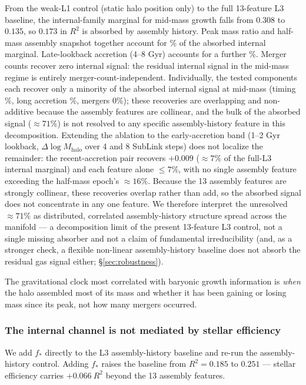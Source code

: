 \documentclass[twocolumn,linenumbers]{aastex701}
\newcommand{\fstar}{f_*}
\begin{document}
From the weak-L1 control (static halo position only) to the full 13-feature L3
baseline, the internal-family marginal for mid-mass growth falls from $0.308$ to
$0.135$, so $0.173$ in $R^2$ is absorbed by assembly history.
Peak mass ratio and half-mass assembly snapshot together account for
\AblationTimingPct\% of the absorbed internal marginal.
Late-lookback accretion (4--8 Gyr) accounts for a further
\AblationLongAccretionPct\%.
Merger counts recover zero internal signal: the residual internal signal in
the mid-mass regime is entirely merger-count-independent.
Individually, the tested components each recover only a minority of the absorbed
internal signal at mid-mass (timing \AblationTimingPct\%, long accretion
\AblationLongAccretionPct\%, mergers 0\%); these recoveries are overlapping and
non-additive because the assembly features are collinear, and the bulk of the
absorbed signal ($\approx 71\%$) is not resolved to any specific assembly-history
feature in this
decomposition.
Extending the ablation to the early-accretion band (1--2 Gyr lookback,
$\Delta\log M_\mathrm{halo}$ over 4 and 8 SubLink steps) does not localize the
remainder: the recent-accretion pair recovers $+0.009$ ($\approx 7\%$ of the
full-L3 internal marginal) and each feature alone $\leq 7\%$, with no single
assembly feature exceeding the half-mass epoch's $\approx 16\%$. Because the 13
assembly features are strongly collinear, these recoveries overlap rather than
add, so the absorbed signal does not concentrate in any one feature. We therefore
interpret the unresolved $\approx 71\%$ as distributed, correlated
assembly-history structure spread across the manifold --- a decomposition limit
of the present 13-feature L3 control, not a single missing absorber and not a
claim of fundamental irreducibility (and, as a stronger check, a flexible
non-linear assembly-history baseline does not absorb the residual gas signal
either; \S\ref{sec:robustness}).

The gravitational clock most correlated with baryonic growth information is
\textit{when} the halo assembled most of its mass and whether it has been
gaining or losing mass since its peak, not how many mergers occurred.

\subsubsection{The internal channel is not mediated by stellar efficiency}

We add $\fstar$ directly to the L3 assembly-history baseline and re-run the
assembly-history control.
Adding $\fstar$ raises the baseline from $R^2 = 0.185$ to $0.251$ ---
stellar efficiency carries $+0.066\ R^2$ beyond the 13 assembly features.
\end{document}
